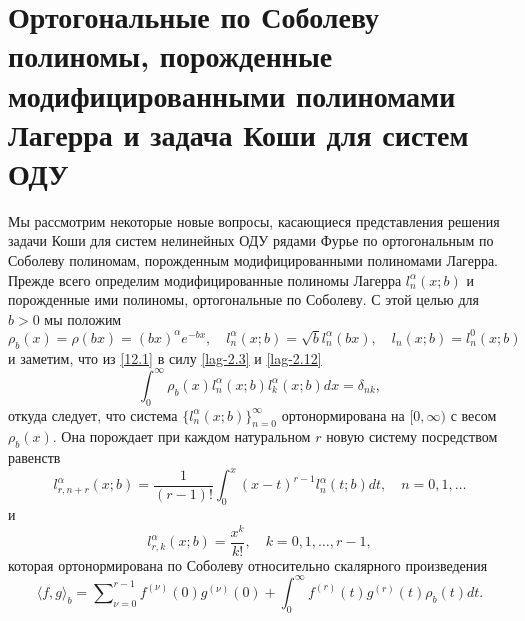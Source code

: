 \section{Ортогональные по Соболеву полиномы, порожденные модифицированными полиномами Лагерра и задача Коши для систем ОДУ}
Мы рассмотрим некоторые новые вопросы, касающиеся представления решения задачи Коши для систем нелинейных ОДУ рядами Фурье по ортогональным по Соболеву полиномам, порожденным модифицированными полиномами Лагерра. Прежде всего определим  модифицированные полиномы Лагерра $l_n^\alpha(x;b)$ и порожденные ими полиномы, ортогональные по Соболеву. С этой целью  для $b>0$ мы положим
\begin{equation}\label{12.1}
\rho_b(x)=\rho(bx)=(bx)^\alpha e^{-bx},\quad l_n^\alpha(x;b)=\sqrt{b}l_n^\alpha(bx),\quad l_n(x;b)=l_n^0(x;b)
\end{equation}
и заметим, что из \eqref{12.1} в силу \eqref{lag-2.3} и \eqref{lag-2.12}
\begin{equation}\label{12.2}
\int_0^\infty\rho_b(x) {l}_n^\alpha(x;b) {l}_k^\alpha(x;b)dx=\delta_{nk},
\end{equation}
откуда следует, что система $\{l_n^\alpha(x;b)\}_{n=0}^\infty$ ортонормирована на $[0,\infty)$ с весом $\rho_b(x)$. Она порождает при каждом натуральном $r$ новую систему посредством равенств
\begin{equation}\label{12.3}
l_{r,n+r}^\alpha(x;b)=\frac{1}{(r-1)!}\int_{0}^x(x-t)^{r-1}{l}_{n}^\alpha(t;b)dt, \quad n=0,1, \ldots
\end{equation}
и
\begin{equation}\label{12.4}
{l}_{r,k}^{\alpha}(x;b) =\frac{x^k}{k!}, \quad k=0,1,\ldots, r-1,
\end{equation}
которая ортонормирована по Соболеву относительно скалярного произведения
\begin{equation}\label{12.5}
\langle f,g\rangle_b=\sum\nolimits_{\nu=0}^{r-1}f^{(\nu)}(0)g^{(\nu)}(0)+\int_{0}^\infty f^{(r)}(t)g^{(r)}(t)\rho_b(t)dt.
\end{equation}

